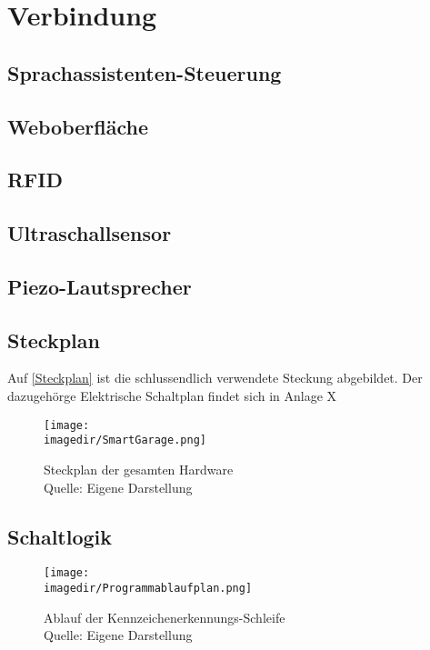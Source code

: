 \chapter{Verbindung}

\section{Sprachassistenten-Steuerung}

\section{Weboberfläche}

\section{RFID}

\section{Ultraschallsensor}
\section{Piezo-Lautsprecher}

\section{Steckplan}

Auf \ref{Steckplan} ist die schlussendlich verwendete Steckung abgebildet. Der dazugehörge Elektrische Schaltplan findet sich in Anlage X %


\begin{figure}
	\centering 
	\texttt{[image: \\imagedir/SmartGarage.png]}
	\captionsetup{format=hang}
	\caption[Steckplan]{\label{fig:test}Steckplan der gesamten Hardware \\Quelle: Eigene Darstellung}
\end{figure}






\section{Schaltlogik}

\begin{figure}
	\centering 
	\texttt{[image: \\imagedir/Programmablaufplan.png]}
	\captionsetup{format=hang}
	\caption[Programmablauf]{\label{fig:test}Ablauf der Kennzeichenerkennungs-Schleife \\Quelle: Eigene Darstellung}
\end{figure}




